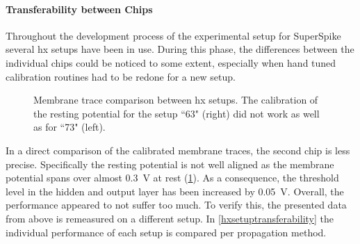 \paragraph{Transferability between Chips}
Throughout the development process of the experimental setup for SuperSpike several \gls{hx} setups have been in use. During this phase, the differences between the individual chips could be noticed to some extent, especially when hand tuned calibration routines had to be redone for a new setup.
\begin{figure}[b!]
	\begin{subfigure}{0.5\textwidth}
		\centering
		
	\end{subfigure}
	\begin{subfigure}{0.5\textwidth}
		\centering
		
	\end{subfigure}
	\caption[Membrane trace comparison between \gls{hx} setups.]{Membrane trace comparison between \gls{hx} setups. The calibration of the resting potential for the setup ``63" (right) did not work as well as for ``73" (left).}
	\label{hxsetupmemtracescomparison}
\end{figure}
In a direct comparison of the calibrated membrane traces, the second chip is less precise. Specifically the resting potential is not well aligned as the membrane potential spans over almost \SI{0.3}{\V} at rest (\cref{hxsetupmemtracescomparison}). As a consequence, the threshold level in the hidden and output layer has been increased by \SI{0.05}{V}. Overall, the performance appeared to not suffer too much. To verify this, the presented data from above is remeasured on a different setup. In \cref{hxsetuptransferability} the individual performance of each setup is compared per propagation method. 

